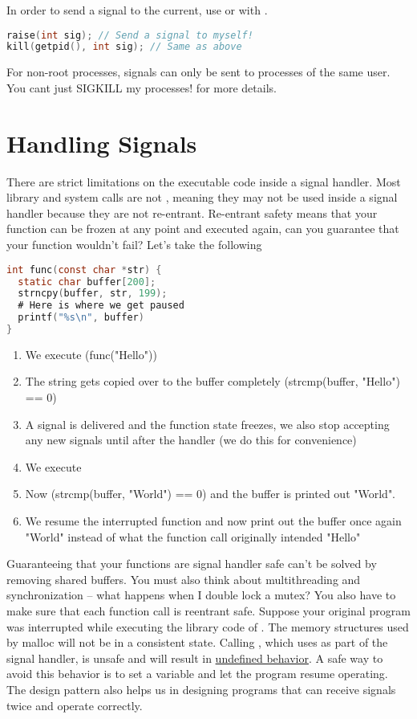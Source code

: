 In order to send a signal to the current, use  or  with .

\begin{lstlisting}[language=C]
raise(int sig); // Send a signal to myself!
kill(getpid(), int sig); // Same as above
\end{lstlisting}

For non-root processes, signals can only be sent to processes of the same user.
You cant just SIGKILL my processes!
 for more details.

\section{Handling Signals}

There are strict limitations on the executable code inside a signal handler.
Most library and system calls are not , meaning they may not be used inside a signal handler because they are not re-entrant.
Re-entrant safety means that your function can be frozen at any point and executed again, can you guarantee that your function wouldn't fail?
Let's take the following

\begin{lstlisting}[language=C]
int func(const char *str) {
  static char buffer[200];
  strncpy(buffer, str, 199);
  # Here is where we get paused
  printf("%s\n", buffer)
}
\end{lstlisting}

\begin{enumerate}
\item We execute \keyword(func("Hello"))
\item The string gets copied over to the buffer completely (strcmp(buffer, "Hello") == 0)
\item A signal is delivered and the function state freezes, we also stop accepting any new signals until after the handler (we do this for convenience)
\item We execute 
\item Now (strcmp(buffer, "World") == 0) and the buffer is printed out "World".
\item We resume the interrupted function and now print out the buffer once again "World" instead of what the function call originally intended "Hello"
\end{enumerate}

Guaranteeing that your functions are signal handler safe can't be solved by removing shared buffers.
You must also think about multithreading and synchronization -- what happens when I double lock a mutex?
You also have to make sure that each function call is reentrant safe.
Suppose your original program was interrupted while executing the library code of .
The memory structures used by malloc will not be in a consistent state.
Calling , which uses  as part of the signal handler, is unsafe and will result in \underline{undefined behavior}.
A safe way to avoid this behavior is to set a variable and let the program resume operating.
The design pattern also helps us in designing programs that can receive signals twice and operate correctly.

